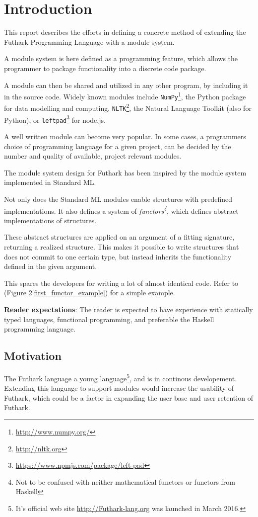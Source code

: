 \section{Introduction}
\label{sec:introduction}
This report describes the efforts in defining a concrete method of extending the Futhark Programming Language with a module system.

A module system is here defined as a programming feature, which allows the programmer to package functionality into a discrete code package.

A module can then be shared and utilized in any other program, by including it in the source code. Widely known modules include \texttt{NumPy}\footnote{\url{http://www.numpy.org/}}, the Python package for
data modelling and computing, \texttt{NLTK}\footnote{\url{http://nltk.org}},
the Natural Language Toolkit (also for Python), or \texttt{leftpad}\footnote{\url{https://www.npmjs.com/package/left-pad}} for node.js.


A well written module can become very popular. In some cases, a programmers choice of programming language for a given project, can be decided by the number and quality of available, project relevant modules.


The module system design for Futhark has been inspired by the module system implemented in Standard ML\cite{crash_course}. 

Not only does the Standard ML modules enable structures with predefined implementations. It also defines a system of \textit{functors\footnote{Not to be confused with neither mathematical functors or functors from Haskell}}, which defines abstract implementations of structures.


These abstract structures are applied on an argument of a fitting signature, returning a realized structure. This makes it possible to write structures that does not commit to one certain type, but instead inherits the functionality defined in the given argument.


This spares the developers for writing a lot of almost identical code. Refer to (Figure 2\ref{first_functor_example}) for a simple example.


\textbf{Reader expectations}:
The reader is expected to have experience with statically typed languages, functional programming, and preferable the Haskell programming language.
\pagebreak
\subsection{Motivation}
\label{subsec:label}
The Futhark language a young language\footnote{It's official web site \url{http://Futhark-lang.org} was launched in March 2016.}, and is in continous developement. Extending this language to support modules would increase the usability of Futhark, which could be a factor in expanding the user base and user retention
of Futhark.


